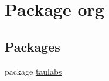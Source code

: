 \hypertarget{namespaceorg}{\section{Package org}
\label{namespaceorg}
}
\subsection*{Packages}
\begin{DoxyCompactItemize}
\item 
package \hyperlink{namespaceorg_1_1taulabs}{taulabs}
\end{DoxyCompactItemize}

